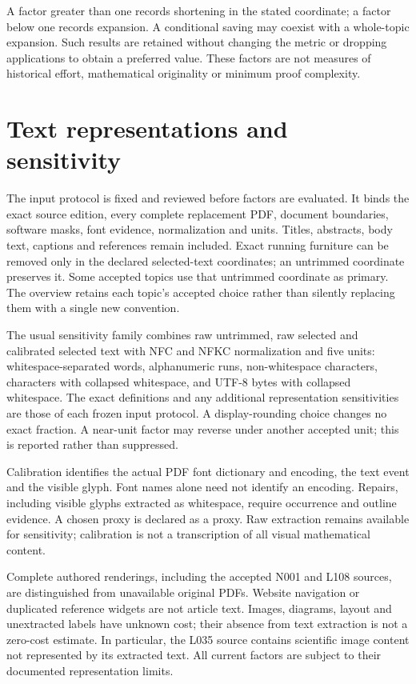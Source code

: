 \documentclass[11pt,a4paper]{article}
\begin{document}
A factor greater than one records shortening in the stated coordinate; a factor
below one records expansion. A conditional saving may coexist with a whole-topic
expansion. Such results are retained without changing the metric or dropping
applications to obtain a preferred value. These factors are not measures of
historical effort, mathematical originality or minimum proof complexity.

\section{Text representations and sensitivity}

The input protocol is fixed and reviewed before factors are evaluated. It binds
the exact source edition, every complete replacement PDF, document boundaries,
software masks, font evidence, normalization and units. Titles, abstracts,
body text, captions and references remain included. Exact running furniture
can be removed only in the declared selected-text coordinates; an untrimmed
coordinate preserves it. Some accepted topics use that untrimmed coordinate
as primary. The overview retains each topic's accepted choice rather than
silently replacing them with a single new convention.

The usual sensitivity family combines raw untrimmed, raw selected and
calibrated selected text with NFC and NFKC normalization and five units:
whitespace-separated words, alphanumeric runs, non-whitespace characters,
characters with collapsed whitespace, and UTF-8 bytes with collapsed whitespace.
The exact definitions and any additional representation sensitivities are those
of each frozen input protocol. A display-rounding choice changes no exact
fraction. A near-unit factor may reverse under another accepted unit; this is
reported rather than suppressed.

Calibration identifies the actual PDF font dictionary and encoding, the text
event and the visible glyph. Font names alone need not identify an encoding.
Repairs, including visible glyphs extracted as whitespace, require occurrence
and outline evidence. A chosen proxy is declared as a proxy. Raw extraction
remains available for sensitivity; calibration is not a transcription of all
visual mathematical content.

Complete authored renderings, including the accepted N001 and L108 sources,
are distinguished from unavailable original PDFs. Website navigation or
duplicated reference widgets are not article text. Images, diagrams, layout and
unextracted labels have unknown cost; their absence from text extraction is not
a zero-cost estimate. In particular, the L035 source contains scientific image
content not represented by its extracted text. All current factors are subject
to their documented representation limits.
\end{document}
